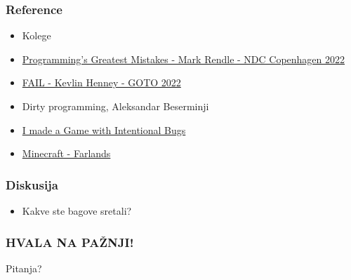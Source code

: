 \documentclass{beamer}
\begin{document}
\begin{frame}
    \frametitle{Reference}
    \begin{itemize}
        \item Kolege \smiley \newline
        \item \href{https://youtu.be/qC_ioJQpv4E}{Programming's Greatest Mistakes - Mark Rendle - NDC Copenhagen 2022} \newline
        \item \href{https://youtu.be/6xrGo1IIB3w}{FAIL - Kevlin Henney - GOTO 2022} \newline
        \item Dirty programming, Aleksandar Beserminji \newline
        \item \href{https://youtu.be/M_iiXaaF5T4}{I made a Game with Intentional Bugs} \newline
        \item \href{https://youtu.be/4f5M1fHxRrQ}{Minecraft - Farlands}
    \end{itemize}
    \end{frame}


\begin{frame}
    \frametitle{Diskusija}
    \begin{itemize}
        \item Kakve ste bagove sretali?
    \end{itemize}
\end{frame}

\begin{frame}
    \frametitle{HVALA NA PAŽNJI!}
    \begin{center}
        \Huge Pitanja?    
    \end{center}
\end{frame}
\end{document}
